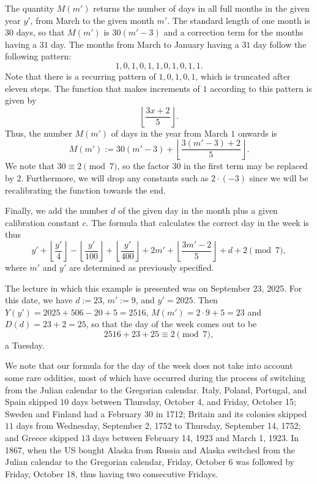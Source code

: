 \begin{example}
  The quantity $M(m')$ returns the number of days in all full months in the given year $y'$, from March to the given month $m'$. The standard length of one month is $30$ days, so that $M(m')$ is $30(m'-3)$ and a correction term for the months having a $31$\supst{} day. The months from March to January having a $31$\supst{} day follow the following pattern:
  \begin{equation*}
    1,0,1,0,1,1,0,1,0,1,1.
  \end{equation*}
  Note that there is a recurring pattern of $1,0,1,0,1$, which is truncated after eleven steps. The function that makes increments of $1$ according to this pattern is given by
  \begin{equation*}
    \left\lfloor\frac{3x+2}{5}\right\rfloor.
  \end{equation*}
  Thus, the number $M(m')$ of days in the year from March $1$\supst{} onwards is
  \begin{equation*}
    M(m'):= 30(m'-3) + \left\lfloor\frac{3(m'-3)+2}{5}\right\rfloor.
  \end{equation*}
  We note that $30\equiv 2\pmod 7$, so the factor $30$ in the first term may be replaced by $2$. Furthermore, we will drop any constants such as $2\cdot (-3)$ since we will be recalibrating the function towards the end.

  Finally, we add the number $d$ of the given day in the month plus a given calibration constant $c$. The formula that calculates the correct day in the week is thus
  \begin{equation*}
    y'+
    \left\lfloor\frac{y'}{4}\right\rfloor
    -\left\lfloor\frac{y'}{100}\right\rfloor
    +\left\lfloor\frac{y'}{400}\right\rfloor
    +2m'
    + \left\lfloor\frac{3m'-2}{5}\right\rfloor
    +d
    +2 \pmod{7},
  \end{equation*}
  where $m'$ and $y'$ are determined as previously specified.
  
  The lecture in which this example is presented was on September 23\suprd{}, 2025. For this date, we have $d:= 23$, $m':= 9$, and $y'=2025$. Then $Y(y')=2025+506-20+5=2516$, $M(m')=2\cdot 9+5=23$ and $D(d)=23+2=25$, so that the day of the week comes out to be
  \begin{equation*}
    2516+23+25 \equiv 2\pmod{7},
  \end{equation*}
  a Tuesday.

  We note that our formula for the day of the week does not take into account some rare oddities, most of which have occurred during the process of switching from the Julian calendar to the Gregorian calendar. Italy, Poland, Portugal, and Spain skipped $10$ days between Thursday, October 4\supth{}, and Friday, October 15\supth{}; Sweden and Finland had a February 30\supth{} in 1712; Britain and its colonies skipped $11$ days from Wednesday, September 2\supnd{}, 1752 to Thursday, September 14\supth{}, 1752; and Greece skipped $13$ days between February 14\supth{}, 1923 and March 1\supst{}, 1923. In 1867, when the US bought Alaska from Russia and Alaska switched from the Julian calendar to the Gregorian calendar, Friday, October 6\supth{} was followed by Friday, October 18\supth{}, thus having two consecutive Fridays.
\end{example}

